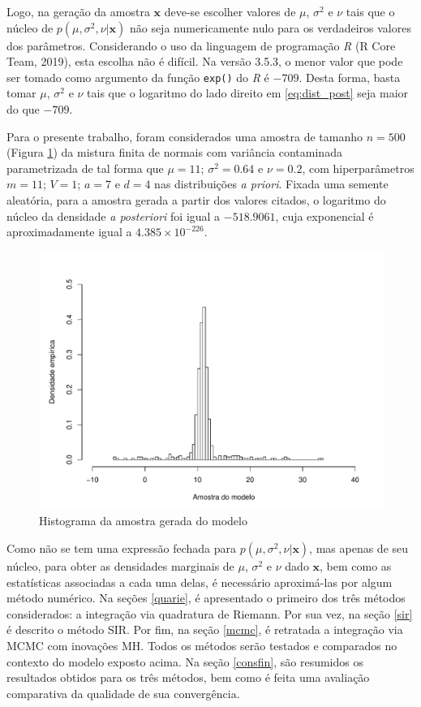 \documentclass[12pt,reqno,a4paper,oneside]{article}
\begin{document}
Logo, na geração da amostra $\bm{x}$ deve-se escolher valores de $\mu$, $\sigma^2$ e $\nu$ tais que o núcleo de $p(\mu, \sigma^2, \nu | \bm{x})$ não seja numericamente nulo para os verdadeiros valores dos parâmetros. Considerando o uso da linguagem de programação \textit{R} (R Core Team, 2019)\cite{RCoreTeam2019}, esta escolha não é difícil. Na versão 3.5.3, o menor valor que pode ser tomado como argumento da função \verb|exp()| do \textit{R} é $-709$. Desta forma, basta tomar $\mu$, $\sigma^2$ e $\nu$ tais que o logaritmo do lado direito em \eqref{eq:dist_post} seja maior do que $-709$.

Para o presente trabalho, foram considerados uma amostra de tamanho $n=500$ (Figura \ref{fig:sample_n}) da mistura finita de normais com variância contaminada parametrizada de tal forma que $\mu = 11$; $\sigma^2 = 0.64$ e $\nu = 0.2$, com hiperparâmetros $m = 11$; $V = 1$; $a = 7$ e $d = 4$ nas distribuições \textit{a priori}. Fixada uma semente aleatória, para a amostra gerada a partir dos valores citados, o logaritmo do núcleo da densidade \textit{a posteriori} foi igual a $-518.9061$, cuja exponencial é aproximadamente igual a $4.385 \times 10^{-226}$.

\begin{figure}[htb]
	\centering
	\includegraphics[scale=0.8]{figuras/amostra_n.pdf}
	\caption{Histograma da amostra gerada do modelo}
	\label{fig:sample_n}
\end{figure}

Como não se tem uma expressão fechada para $p(\mu, \sigma^2, \nu | \bm{x})$, mas apenas de seu núcleo, para obter as densidades marginais de $\mu$, $\sigma^2$ e $\nu$ dado $\bm{x}$, bem como as estatísticas associadas a cada uma delas, é necessário aproximá-las por algum método numérico. Na seções \ref{quarie}, é apresentado o primeiro dos três métodos considerados: a integração via quadratura de Riemann. Por sua vez, na seção \ref{sir} é descrito o método SIR. Por fim, na seção \ref{mcmc}, é retratada a integração via MCMC com inovações MH. Todos os métodos serão testados e comparados no contexto do modelo exposto acima. Na seção \ref{consfin}, são resumidos os resultados obtidos para os três métodos, bem como é feita uma avaliação comparativa da qualidade de sua convergência.
\end{document}
